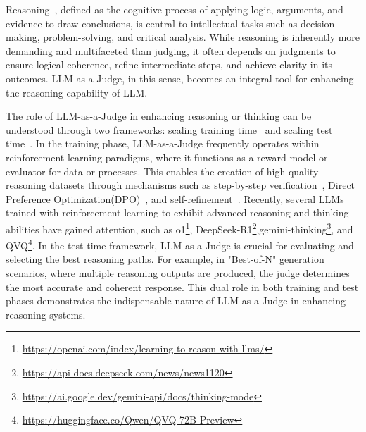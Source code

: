 \documentclass[acmsmall,screen]{acmart}
\begin{document}
Reasoning~\cite{reasoning_survey}, defined as the cognitive process of applying logic, arguments, and evidence to draw conclusions, is central to intellectual tasks such as decision-making, problem-solving, and critical analysis. 
While reasoning is inherently more demanding and multifaceted than judging, it often depends on judgments to ensure logical coherence, refine intermediate steps, and achieve clarity in its outcomes. LLM-as-a-Judge, in this sense, becomes an integral tool for enhancing the reasoning capability of LLM. 


The role of LLM-as-a-Judge in enhancing reasoning or thinking can be understood through two frameworks: scaling training time~\citep{scaling_rl,trung2024reft} and scaling test time~\cite{scaling_test_time}. In the training phase, LLM-as-a-Judge frequently operates within reinforcement learning paradigms, where it functions as a reward model or evaluator for data or processes. This enables the creation of high-quality reasoning datasets through mechanisms such as step-by-step verification~\cite{let_verify_step}, Direct Preference Optimization(DPO)~\cite{dpo}, and self-refinement~\cite{self_rewarding_lm}. Recently, several LLMs trained with reinforcement learning to exhibit advanced reasoning and thinking abilities have gained attention, such as o1\footnote{\url{https://openai.com/index/learning-to-reason-with-llms/}}, DeepSeek-R1\footnote{\url{https://api-docs.deepseek.com/news/news1120}},gemini-thinking\footnote{\url{https://ai.google.dev/gemini-api/docs/thinking-mode}}, and QVQ\footnote{\url{https://huggingface.co/Qwen/QVQ-72B-Preview}}. 
In the test-time framework, LLM-as-a-Judge is crucial for evaluating and selecting the best reasoning paths. For example, in "Best-of-N" generation scenarios, where multiple reasoning outputs are produced, the judge determines the most accurate and coherent response. This dual role in both training and test phases demonstrates the indispensable nature of LLM-as-a-Judge in enhancing reasoning systems.


\setcounter{footnote}{0}
\end{document}
